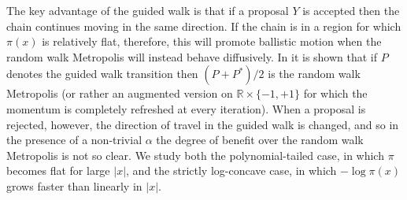 \documentclass{article}
\theoremstyle{definition}
\theoremstyle{plain}
\begin{document}
The key advantage of the guided walk is that if a proposal $Y$ is accepted then the chain continues moving in the same direction.  If the chain is in a region for which $\pi(x)$ is relatively flat, therefore, this will promote ballistic motion when the random walk Metropolis will instead behave diffusively.  In \cite{andrieu2021peskun} it is shown that if $P$ denotes the guided walk transition then $(P+P^*)/2$ is the random walk Metropolis (or rather an augmented version on $\mathbb{R} \times \{-1,+1\}$ for which the momentum is completely refreshed at every iteration).  When a proposal is rejected, however, the direction of travel in the guided walk is changed, and so in the presence of a non-trivial $\alpha$ the degree of benefit over the random walk Metropolis is not so clear.  We study both the polynomial-tailed case, in which $\pi$ becomes flat for large $|x|$, and the strictly log-concave case, in which $-\log \pi(x)$ grows faster than linearly in $|x|$.




\end{document}
